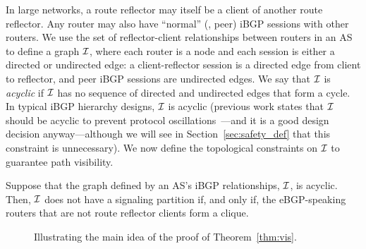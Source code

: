 In large networks, a route reflector may itself be a client
of another route reflector.  Any router may also have ``normal'' (\ie,
peer) iBGP sessions with other routers.  We use the set of
reflector-client relationships between routers in an AS to define a
graph $\mathcal{I}$, where each router is a node and each session is either a
directed or undirected edge: a client-reflector session is a directed
edge from client to reflector, and peer iBGP sessions are undirected
edges. We say that $\mathcal{I}$ is {\em acyclic} if $\mathcal{I}$ has no sequence of
directed and undirected edges that form a cycle.  In typical iBGP
hierarchy designs, $\mathcal{I}$ is acyclic (previous work states that $\mathcal{I}$ should
be acyclic to prevent protocol oscillations~\cite{Griffin2000}---and it
is a good design decision anyway---although
we will see in Section~\ref{sec:safety_def} that this constraint is
unnecessary).  We now define the topological constraints on $\mathcal{I}$ to
guarantee path visibility.


\begin{theorem}\label{thm:vis}
Suppose that the graph defined by an AS's iBGP relationships, $\mathcal{I}$, is
acyclic.  Then, $\mathcal{I}$ does not have a signaling partition if, and only
if, the eBGP-speaking routers that are not route reflector clients form
a clique. 
\end{theorem}

\begin{figure}
\centering
\begin{psfrags}
\end{psfrags}
\caption[The main idea of the proof of
  Theorem~\ref{thm:vis}.]{Illustrating the main idea of the proof of
  Theorem~\ref{thm:vis}.}
\label{fig:path_vis_ibgp}
\end{figure}

